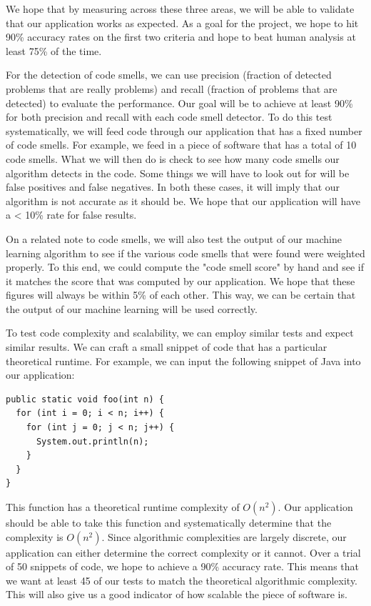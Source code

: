 \documentclass{sig-alternate}
\begin{document}
We hope that by measuring across these three areas, we will be able to validate that our application works as expected. As a goal for the project, we hope to hit 90\% accuracy rates on the first two criteria and hope to beat human analysis at least 75\% of the time.

For the detection of code smells, we can use precision (fraction of detected problems that are really problems) and recall (fraction of problems that are detected) to evaluate the performance. Our goal will be to achieve at least 90\% for both precision and recall with each code smell detector. To do this test systematically, we will feed code through our application that has a fixed number of code smells. For example, we feed in a piece of software that has a total of 10 code smells. What we will then do is check to see how many code smells our algorithm detects in the code. Some things we will have to look out for will be false positives and false negatives. In both these cases, it will imply that our algorithm is not accurate as it should be. We hope that our application will have a < 10\% rate for false results. 

On a related note to code smells, we will also test the output of our machine learning algorithm to see if the various code smells that were found were weighted properly. To this end, we could compute the "code smell score" by hand and see if it matches the score that was computed by our application. We hope that these figures will always be within 5\% of each other. This way, we can be certain that the output of our machine learning will be used correctly.

To test code complexity and scalability, we can employ similar tests and expect similar results. We can craft a small snippet of code that has a particular theoretical runtime. For example, we can input the following snippet of Java into our application:

\begin{verbatim}
public static void foo(int n) {
  for (int i = 0; i < n; i++) {
    for (int j = 0; j < n; j++) {
      System.out.println(n);
    }
  }
}
\end{verbatim}

This function has a theoretical runtime complexity of $O(n^2)$. Our application should be able to take this function and systematically determine that the complexity is $O(n^2)$. Since algorithmic complexities are largely discrete, our application can either determine the correct complexity or it cannot. Over a trial of 50 snippets of code, we hope to achieve a 90\% accuracy rate. This means that we want at least 45 of our tests to match the theoretical algorithmic complexity. This will also give us a good indicator of how scalable the piece of software is.
\end{document}
